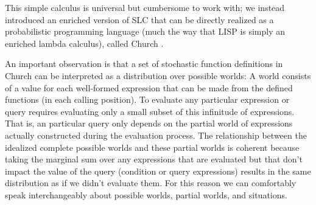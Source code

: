 \documentclass[12pt]{article}
\newcounter{definition}
\begin{document}
This simple calculus is universal but cumbersome to work with; we instead introduced an enriched version of SLC that can be directly realized as a probabilistic programming language (much the way that LISP is simply an enriched lambda calculus), called Church \cite{Goodman}.


An important observation is that a set of stochastic function definitions in Church can be interpreted as a distribution over possible worlds: A world consists of a value for each well-formed expression that can be made from the defined functions (in each calling position). To evaluate any particular expression or query requires evaluating only a small subset of this infinitude of expressions. That is, an particular query only depends on the partial world of expressions actually constructed during the evaluation process. The relationship between the idealized complete possible worlds and these partial worlds is coherent because taking the marginal sum over any expressions that are evaluated but that don't impact the value of the query (condition or query expressions) results in the same distribution as if we didn't evaluate them.  For this reason we can comfortably speak interchangeably about possible worlds, partial worlds, and situations.
\end{document}
